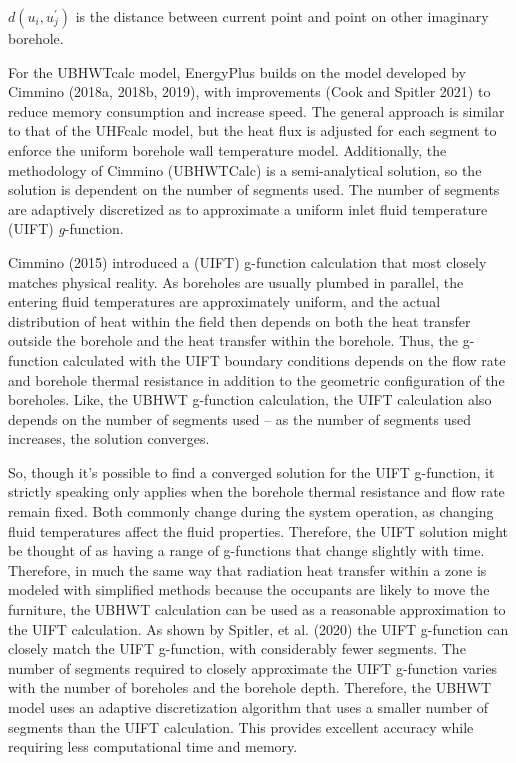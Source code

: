 \(d(u_i, u_j^{'})\) is the distance between current point and point on other imaginary borehole.

For the UBHWTcalc model, EnergyPlus builds on the model developed by Cimmino (2018a, 2018b, 2019), with improvements (Cook and Spitler 2021) to reduce memory consumption and increase speed. The general approach is similar to that of the UHFcalc model, but the heat flux is adjusted for each segment to enforce the uniform borehole wall temperature model. Additionally, the methodology of Cimmino (UBHWTCalc) is a semi-analytical solution, so the solution is dependent on the number of segments used. The number of segments are adaptively discretized as to approximate a uniform inlet fluid temperature (UIFT) \emph{g}-function. 

Cimmino (2015) introduced a (UIFT) g-function calculation that most closely matches physical reality. As boreholes are usually plumbed in parallel, the entering fluid temperatures are approximately uniform, and the actual distribution of heat within the field then depends on both the heat transfer outside the borehole and the heat transfer within the borehole. Thus, the g-function calculated with the UIFT boundary conditions depends on the flow rate and borehole thermal resistance in addition to the geometric configuration of the boreholes. Like, the UBHWT g-function calculation, the UIFT calculation also depends on the number of segments used – as the number of segments used increases, the solution converges. 

So, though it’s possible to find a converged solution for the UIFT g-function, it strictly speaking only applies when the borehole thermal resistance and flow rate remain fixed. Both commonly change during the system operation, as changing fluid temperatures affect the fluid properties. Therefore, the UIFT solution might be thought of as having a range of g-functions that change slightly with time. Therefore, in much the same way that radiation heat transfer within a zone is modeled with simplified methods because the occupants are likely to move the furniture, the UBHWT calculation can be used as a reasonable approximation to the UIFT calculation. As shown by Spitler, et al. (2020) the UIFT g-function can closely match the UIFT g-function, with considerably fewer segments. The number of segments required to closely approximate the UIFT g-function varies with the number of boreholes and the borehole depth. Therefore, the UBHWT model uses an adaptive discretization algorithm that uses a smaller number of segments than the UIFT calculation. This provides excellent accuracy while requiring less computational time and memory. 


